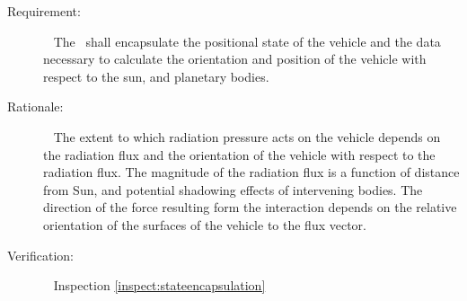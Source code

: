 
%
%
%



\label{reqt:stateencapsulation}
\begin{description}
  \item[Requirement:]\ \newline
     The \RadiationPressureDesc\ shall encapsulate the positional state of the vehicle and the
     data necessary to calculate the orientation and position of the vehicle
     with respect to the sun, and planetary bodies.

  \item[Rationale:]\ \newline
     The extent to which radiation pressure acts on the vehicle depends on the
     radiation flux and the orientation of the vehicle with respect to the
     radiation flux.  The magnitude of the radiation flux is a function of
     distance from Sun, and potential shadowing effects of intervening bodies.
     The direction of the force resulting form the interaction depends on the
     relative orientation of the surfaces of the vehicle to the flux vector.

  \item[Verification:]\ \newline
     Inspection \vref{inspect:stateencapsulation}
\end{description}


